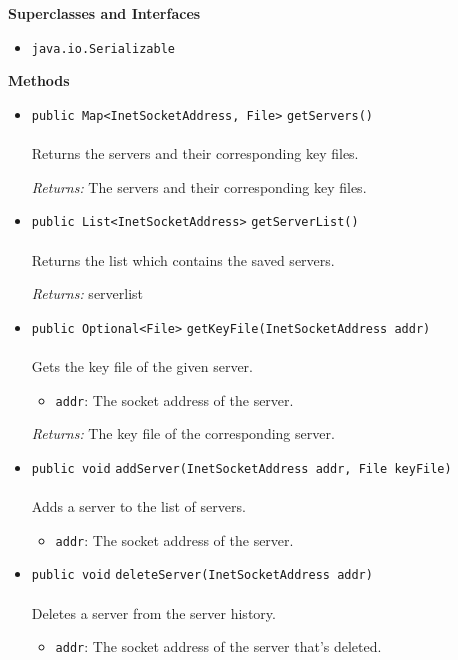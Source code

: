 \textbf{\sffamily Superclasses and Interfaces}
\begin{itemize}
\item \lstinline|java.io.Serializable|
\end{itemize}



\textbf{\sffamily Methods}
\begin{itemize}
\item \lstinline|public Map<InetSocketAddress, File>| \lstinline|getServers|\lstinline|()|\\ \\[-0.6em]
Returns the servers and their corresponding key files.

\emph{Returns:} The servers and their corresponding key files.

\item \lstinline|public List<InetSocketAddress>| \lstinline|getServerList|\lstinline|()|\\ \\[-0.6em]
Returns the list which contains the saved servers.

\emph{Returns:} serverlist

\item \lstinline|public Optional<File>| \lstinline|getKeyFile|\lstinline|(InetSocketAddress addr)|\\ \\[-0.6em]
Gets the key file of the given server.
\begin{itemize}
\item \lstinline|addr|: The socket address of the server.
\end{itemize}

\emph{Returns:} The key file of the corresponding server.

\item \lstinline|public void| \lstinline|addServer|\lstinline|(InetSocketAddress addr, File keyFile)|\\ \\[-0.6em]
Adds a server to the list of servers.
\begin{itemize}
\item \lstinline|addr|: The socket address of the server.
\end{itemize}



\item \lstinline|public void| \lstinline|deleteServer|\lstinline|(InetSocketAddress addr)|\\ \\[-0.6em]
Deletes a server from the server history.
\begin{itemize}
\item \lstinline|addr|: The socket address of the server that's deleted.
\end{itemize}




\end{itemize}
